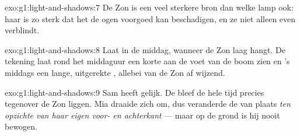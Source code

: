 \begin{solution}{exo:g1:light-and-shadows:7}
De Zon is een veel sterkere bron dan welke lamp ook: haar
 is zo sterk dat het de ogen voorgoed kan beschadigen, en ze
niet alleen even verblindt.
\end{solution}

\begin{solution}{exo:g1:light-and-shadows:8}
Laat in de middag, wanneer de Zon laag hangt. De tekening laat rond
het middaguur een korte  aan de voet van de boom zien en 's
middags een lange, uitgerekte , allebei van de Zon af wijzend.
\end{solution}

\begin{solution}{exo:g1:light-and-shadows:9}
Sam heeft gelijk. De  bleef de hele tijd precies tegenover de
Zon liggen. Mia draaide zich om, dus veranderde de  van plaats
\emph{ten opzichte van haar eigen voor- en achterkant} --- maar op de
grond is hij nooit bewogen.
\end{solution}
